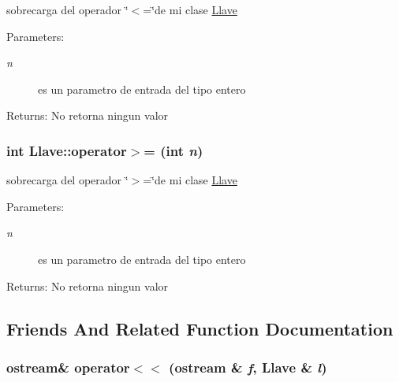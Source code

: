 sobrecarga del operador \char`\"{}$<$=\char`\"{}de mi clase \hyperlink{classLlave}{Llave} \begin{Desc}
\item[Parameters:]
\begin{description}
\item[{\em n}]es un parametro de entrada del tipo entero \end{description}
\end{Desc}
\begin{Desc}
\item[Returns:]No retorna ningun valor \end{Desc}
\hypertarget{classLlave_21d29952725fc8390d668e5ad2094110}{
\subsubsection[operator$>$=]{\setlength{\rightskip}{0pt plus 5cm}int Llave::operator$>$= (int {\em n})}}
\label{classLlave_21d29952725fc8390d668e5ad2094110}


sobrecarga del operador \char`\"{}$>$=\char`\"{}de mi clase \hyperlink{classLlave}{Llave} \begin{Desc}
\item[Parameters:]
\begin{description}
\item[{\em n}]es un parametro de entrada del tipo entero \end{description}
\end{Desc}
\begin{Desc}
\item[Returns:]No retorna ningun valor \end{Desc}


\subsection{Friends And Related Function Documentation}
\hypertarget{classLlave_749fde97e089059539e396738c36b7d3}{
\subsubsection[operator$<$$<$]{\setlength{\rightskip}{0pt plus 5cm}ostream\& operator$<$$<$ (ostream \& {\em f}, \/  {\bf Llave} \& {\em l})}}
\label{classLlave_749fde97e089059539e396738c36b7d3}


